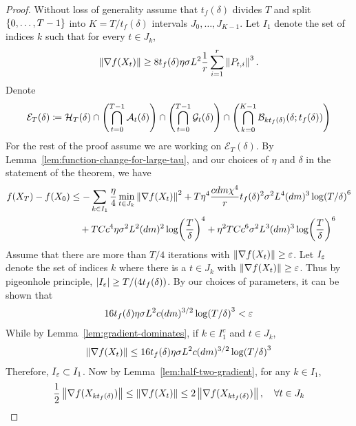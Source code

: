\begin{proof}
    Without loss of generality assume that $t_f(\delta)$ divides $T$ and split $\left\{0, \ldots, T-1\right\}$ into $K=T/t_f(\delta)$ intervals $J_0, \ldots, J_{K-1}$. Let $I_1$ denote the set of indices $k$ such that for every $t \in J_k$,
    \begin{align*}
        \left\lVert \nabla f(X_t) \right\rVert \geq 8t_f(\delta) \eta \sigma L^2 \frac{1}{r} \sum_{i=1}^r \left\lVert P_{t,i} \right\rVert^3.
    \end{align*}
    Denote
    \begin{align*}
        \mathcal E_T(\delta) \coloneqq \mathcal H_T(\delta) \cap \qty(\bigcap_{t=0}^{T-1} \mathcal A_t(\delta)) \cap \qty(\bigcap_{t=0}^{T-1} \mathcal G_t(\delta)) \cap \qty(\bigcap_{k=0}^{K-1} \mathcal B_{kt_f(\delta)}(\delta ; t_f(\delta)))
    \end{align*}
    For the rest of the proof assume we are working on $\mathcal E_T(\delta)$. By Lemma~\ref{lem:function-change-for-large-tau}, and our choices of $\eta$ and $\delta$ in the statement of the theorem, we have
    \begin{align*}
        f(X_T) - f(X_0) &\leq  -\sum_{k \in I_1} \frac{\eta}{4} \min_{t \in J_k} \left\lVert \nabla f(X_t) \right\rVert^2 + T \eta^4 \frac{cdm\chi^4}{r} t_f(\delta)^2 \sigma^2 L^4 (dm)^3 \log(T/\delta)^6\\
        &\quad + T C c^4 \eta \sigma^2 L^2(dm)^2 \log(\frac T\delta)^4 + \eta^2 T C c^6  \sigma^2 L^3 (dm)^3 \log(\frac T \delta)^6
    \end{align*}
    Assume that there are more than $T/4$ iterations with $\left\lVert \nabla f(X_t) \right\rVert \geq \varepsilon$. Let $I_\varepsilon$ denote the set of indices $k$ where there is a $t \in J_k$ with $\left\lVert \nabla f(X_t) \right\rVert \geq \varepsilon$. Thus by pigeonhole principle, $|I_\varepsilon| \geq T/(4t_f(\delta))$. By our choices of parameters, it can be shown that
    \begin{align*}
        16 t_f(\delta) \eta \sigma L^2 c(dm)^{3/2} \log(T/\delta)^3 < \varepsilon
    \end{align*}
    While by Lemma~\ref{lem:gradient-dominates}, if $k \in I_1^c$ and $t \in J_k$,
    \begin{align*}
        \left\lVert \nabla f(X_t) \right\rVert \leq 16 t_f(\delta) \eta \sigma L^2 c(dm)^{3/2} \log(T/\delta)^3
    \end{align*}
    Therefore, $I_\varepsilon \subset I_1$. Now by Lemma~\ref{lem:half-two-gradient}, for any $k \in I_1$, 
    \begin{align*}
        \frac 12 \mg{\grad f(X_{kt_f(\delta)})} \leq \mg{\grad f(X_t)} \leq 2\mg{\grad f(X_{kt_f(\delta)})}, \quad \forall t \in J_k

\end{align*}
\end{proof}
